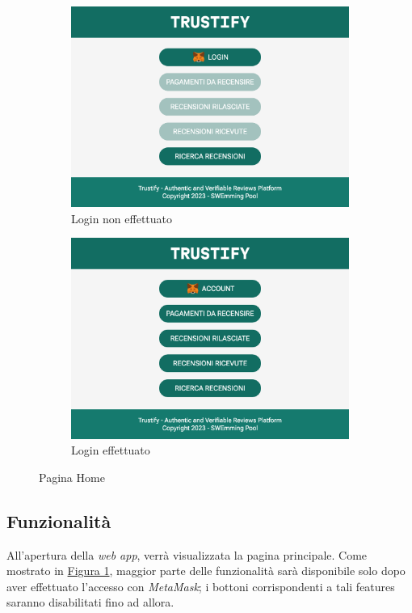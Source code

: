 \begin{figure}[H]
    \centering
    \begin{subfigure}[t]{0.49\textwidth}
    \centering
    \includegraphics[width=0.9\linewidth]{src/img/home.png}
    \caption{Login non effettuato}\label{fig:home_nologin}
    \end{subfigure}
    \centering
    \begin{subfigure}[t]{0.49\textwidth}
    \centering
    \includegraphics[width=0.9\linewidth]{src/img/home_login.png}
    \caption{Login effettuato}\label{fig:home_login}
    \end{subfigure}

    \caption{Pagina Home}\label{fig:home}
\end{figure}
\subsection{Funzionalità}
All'apertura della \textit{web app}, verrà visualizzata la pagina principale. Come mostrato in \hyperref[fig:home]{Figura 1}, maggior parte delle funzionalità sarà disponibile solo dopo aver effettuato l'accesso con \textit{MetaMask}; i bottoni corrispondenti a tali features saranno disabilitati fino ad allora.

